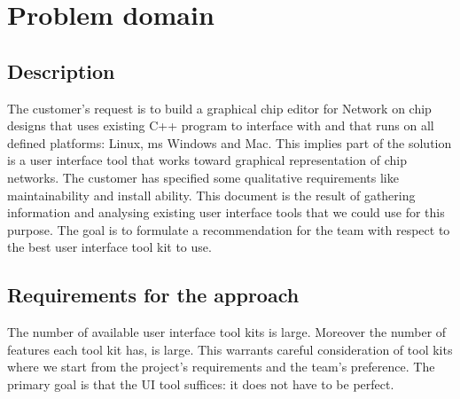 \section{Problem domain}
\subsection{Description}

The customer's request is to build a graphical chip editor for Network on chip
designs that uses existing C++ program to interface with and that runs on all
defined platforms: Linux, ms Windows and Mac. This implies part of the solution
is a user interface tool that works toward graphical representation of chip
networks. The customer has specified some qualitative requirements like
maintainability and install ability. This document is the result of gathering
information and analysing existing user interface tools that we could use for
this purpose. The goal is to formulate a recommendation for the team with
respect to the best user interface tool kit to use.

\subsection{Requirements for the approach}

The number of available user interface tool kits is large.  Moreover the number
of features each tool kit has, is large. This warrants careful consideration of
tool kits where we start from the project's requirements and the team's
preference. The primary goal is that the UI tool suffices: it does not have to
be perfect.
